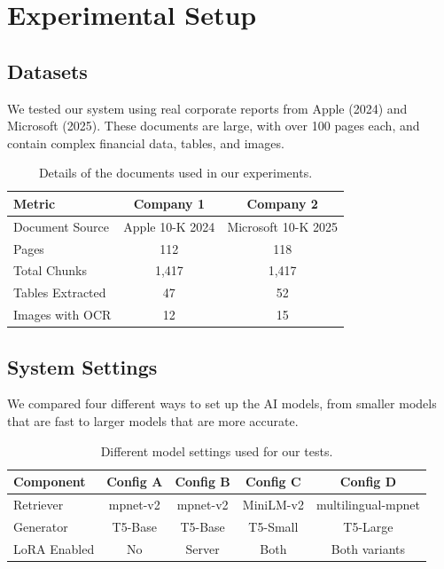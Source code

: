 \documentclass[acmsmall,screen]{acmart}
\begin{document}
\section{Experimental Setup}

\subsection{Datasets}
We tested our system using real corporate reports from Apple (2024) and Microsoft (2025). These documents are large, with over 100 pages each, and contain complex financial data, tables, and images.

\begin{table}[h]
\centering
\caption{Details of the documents used in our experiments.}
\label{tab:datasets}
\begin{tabular}{@{}lcc@{}}
\toprule
\textbf{Metric} & \textbf{Company 1} & \textbf{Company 2} \\
\midrule
Document Source & Apple 10-K 2024 & Microsoft 10-K 2025 \\
Pages & 112 & 118 \\
Total Chunks & 1,417 & 1,417 \\
Tables Extracted & 47 & 52 \\
Images with OCR & 12 & 15 \\
\bottomrule
\end{tabular}
\end{table}

\subsection{System Settings}
We compared four different ways to set up the AI models, from smaller models that are fast to larger models that are more accurate.

\begin{table}[h]
\centering
\caption{Different model settings used for our tests.}
\label{tab:models}
\begin{tabular}{@{}lcccc@{}}
\toprule
\textbf{Component} & \textbf{Config A} & \textbf{Config B} & \textbf{Config C} & \textbf{Config D} \\
\midrule
Retriever & mpnet-v2 & mpnet-v2 & MiniLM-v2 & multilingual-mpnet \\
Generator & T5-Base & T5-Base & T5-Small & T5-Large \\
LoRA Enabled & No & Server & Both & Both variants \\
\bottomrule
\end{tabular}
\end{table}
\end{document}
